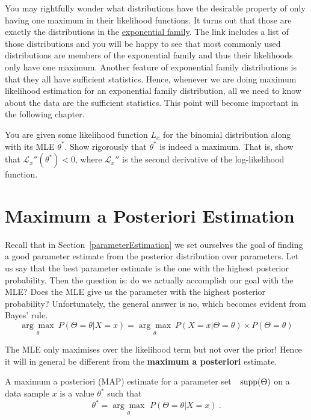You may rightfully wonder what distributions have the desirable property of only having one maximum in their likelihood functions. It turns out that those are
exactly the distributions in the \href{https://en.wikipedia.org/wiki/Exponential_family}{exponential family}. The link includes a list of those distributions and
you will be happy to see that most commonly used distributions are members of the exponential family and thus their likelihoods only have one maximum. Another feature of exponential family distributions is that
they all have sufficient statistics. Hence, whenever we are doing maximum likelihood estimation for 
an exponential family distribution, all we need to know about the data are the sufficient statistics. This
point will become important in the following chapter.

\begin{Exercise}
You are given some likelihood function $ L_{x} $ for the binomial distribution along with its MLE $ \theta^{*} $. Show rigorously that $ \theta^{*} $ is indeed
a maximum. That is, show that $ \mathcal{L}_{x}''(\theta^{*}) < 0 $, where $ \mathcal{L}_{x}'' $ is the second derivative of the log-likelihood function.
\end{Exercise}

 
\section{Maximum a Posteriori Estimation}

Recall that in Section~\ref{parameterEstimation} we set ourselves the goal of finding a good parameter estimate from the posterior distribution over parameters.
Let us say that the best parameter estimate is the one with the highest posterior probability. Then the question is: do we actually accomplish our goal with the MLE?
Does the MLE give us the parameter with the highest posterior probability? Unfortunately, the general answer is no, which becomes evident from Bayes' rule.
\begin{equation}
\underset{\theta}{\arg\max}~P(\Theta = \theta| X=x) = \underset{\theta}{\arg\max}~P(X=x|\Theta=\theta) \times P(\Theta = \theta)
\end{equation}

The MLE only maximises over the likelihood term but not over the prior! Hence it will in general be different from the \textbf{maximum a posteriori} estimate.

\begin{Definition}
A maximum a posteriori (MAP) estimate for a parameter set~~$\operatorname{supp}(\Theta)$ on a data sample $ x $ 
is a value $ \theta^{*} $ such that
$$ \theta^{*} = \underset{\theta}{\arg\max}\, \, P(\Theta = \theta| X=x) \ . $$
\end{Definition}

